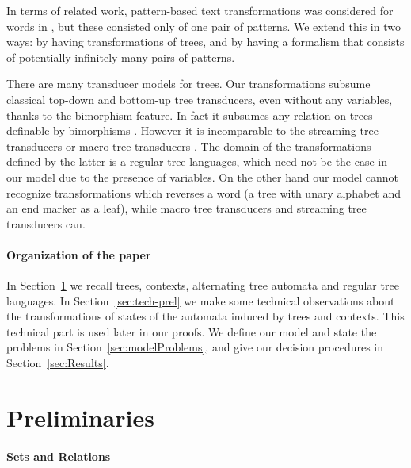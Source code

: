 \documentclass[12pt, a4paper]{article}
\begin{document}
In terms of related work, pattern-based text transformations was considered for words in \cite{AMP2022}, but these consisted only of one pair of patterns. We extend this in two ways: by having  transformations of trees, and by having a formalism that consists of potentially infinitely many pairs of patterns. 

\smallskip
There are many transducer models for trees. Our transformations subsume classical top-down and bottom-up tree transducers, even without any variables, thanks to the bimorphism feature. In fact it subsumes any relation on trees definable by bimorphisms \cite[Chapter 6]{tata}. However it is incomparable to the streaming tree transducers \cite{ADA2017} or macro tree transducers \cite{EV1985}. The domain of the  transformations defined by the latter is a regular tree languages, which need not be the case in our model due to the presence of variables. On the other hand our model cannot recognize transformations which reverses a word (a tree with unary alphabet and an end marker as a leaf), while macro tree transducers and streaming tree transducers can. 

\paragraph*{Organization of the paper}
In Section~\ref{sec:preliminaries} we recall trees, contexts, alternating tree automata and regular tree languages. In Section~\ref{sec:tech-prel} we make some technical observations about the transformations of states of the automata induced by trees and contexts. This technical part is used later in our proofs. We define our model and state the problems in Section~\ref{sec:modelProblems}, and give our decision procedures in Section~\ref{sec:Results}. 



\section{Preliminaries}\label{sec:preliminaries}

\paragraph*{Sets and Relations}\label{par:setTheory}
\end{document}

